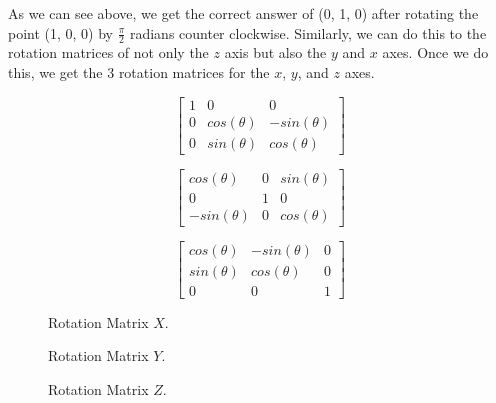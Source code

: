 \documentclass[14pt]{article}
\begin{document}
\vspace*{1em}

As we can see above, we get the correct answer of (0, 1, 0) after rotating the point (1, 0, 0) by $\frac{\pi}{2}$ radians counter clockwise. Similarly, we can do this to the rotation matrices of not only the $z$ axis but also the $y$ and $x$ axes. Once we do this, we get the 3 rotation matrices for the $x$, $y$, and $z$ axes.

\begin{figure}[h]
	\vspace*{1em}
	\begin{center}
		\begin{minipage}[b]{0.3\textwidth}
			\centering
			
			$$
			\begin{bmatrix}
			1 & 0 & 0 \\
			0 & cos(\theta) & -sin(\theta) \\ 
			0 & sin(\theta) & cos(\theta)
			\end{bmatrix}
			$$
		\end{minipage}
		\hfill
		\begin{minipage}[b]{0.3\textwidth}
			\centering
			$$
			\begin{bmatrix}
			cos(\theta) & 0 & sin(\theta) \\
			0 & 1 & 0 \\
			-sin(\theta) & 0 & cos(\theta)
			\end{bmatrix}			
			$$
		\end{minipage}
		\hfill
		\begin{minipage}[b]{0.3\textwidth}
			\centering
			$$
			\begin{bmatrix}
			cos(\theta) & -sin(\theta) & 0 \\
			sin(\theta) & cos(\theta) & 0 \\
			0 & 0 & 1
			\end{bmatrix}			
			$$
		\end{minipage}
	\end{center}
	\begin{center}
		\begin{minipage}[t]{0.3\textwidth}
			\caption*{Rotation Matrix $X$.}
		\end{minipage}
		\hfill
		\begin{minipage}[t]{0.3\textwidth}
			\caption*{Rotation Matrix $Y$.}
		\end{minipage}
		\hfill
		\begin{minipage}[t]{0.3\textwidth}
			\caption*{Rotation Matrix $Z$.}
		\end{minipage}
	\end{center}
\end{figure}
\end{document}

